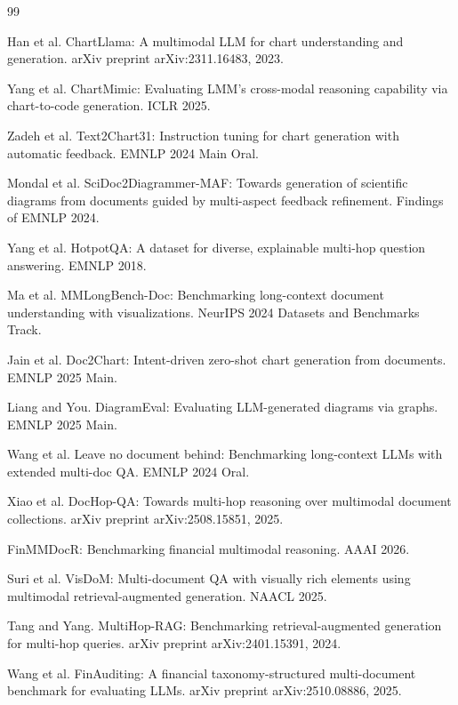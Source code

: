 \documentclass[11pt]{article}
\begin{document}
\begin{thebibliography}{99}

Han et al. ChartLlama: A multimodal LLM for chart understanding and generation. arXiv preprint arXiv:2311.16483, 2023.

Yang et al. ChartMimic: Evaluating LMM's cross-modal reasoning capability via chart-to-code generation. ICLR 2025.

Zadeh et al. Text2Chart31: Instruction tuning for chart generation with automatic feedback. EMNLP 2024 Main Oral.

Mondal et al. SciDoc2Diagrammer-MAF: Towards generation of scientific diagrams from documents guided by multi-aspect feedback refinement. Findings of EMNLP 2024.

Yang et al. HotpotQA: A dataset for diverse, explainable multi-hop question answering. EMNLP 2018.

Ma et al. MMLongBench-Doc: Benchmarking long-context document understanding with visualizations. NeurIPS 2024 Datasets and Benchmarks Track.

Jain et al. Doc2Chart: Intent-driven zero-shot chart generation from documents. EMNLP 2025 Main.

Liang and You. DiagramEval: Evaluating LLM-generated diagrams via graphs. EMNLP 2025 Main.

Wang et al. Leave no document behind: Benchmarking long-context LLMs with extended multi-doc QA. EMNLP 2024 Oral.

Xiao et al. DocHop-QA: Towards multi-hop reasoning over multimodal document collections. arXiv preprint arXiv:2508.15851, 2025.

FinMMDocR: Benchmarking financial multimodal reasoning. AAAI 2026.

Suri et al. VisDoM: Multi-document QA with visually rich elements using multimodal retrieval-augmented generation. NAACL 2025.

Tang and Yang. MultiHop-RAG: Benchmarking retrieval-augmented generation for multi-hop queries. arXiv preprint arXiv:2401.15391, 2024.

Wang et al. FinAuditing: A financial taxonomy-structured multi-document benchmark for evaluating LLMs. arXiv preprint arXiv:2510.08886, 2025.


\end{thebibliography}
\end{document}
